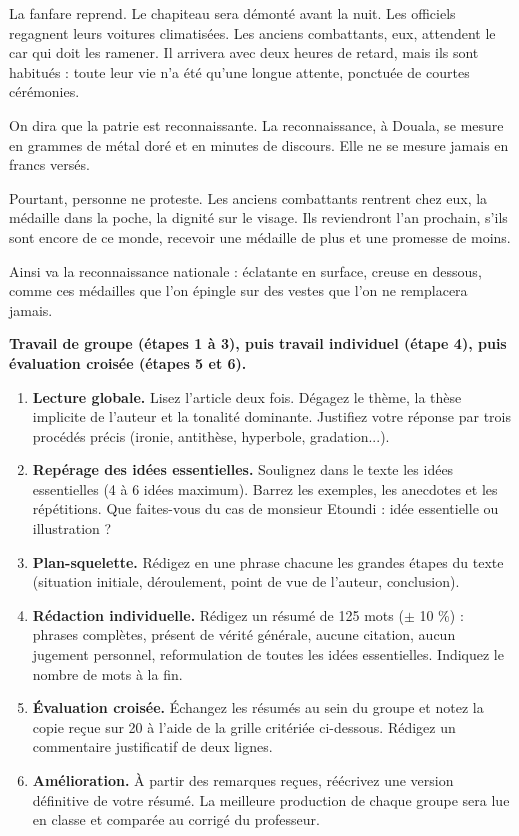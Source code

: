 \documentclass[11pt]{article}
\newcounter{popsec}
\newcounter{popsub}
\newcommand{\courssub}[1]{%
  \stepcounter{popsub}%
  \par\vspace{9pt}\noindent{\popxbold\fontsize{11.5}{13}\selectfont\color{popink}{\color{poporange}\thepopsec.\thepopsub}\hspace{6pt}#1}\par\nopagebreak\vspace{4pt}
}
\begin{document}
\begin{exemplebox}
La fanfare reprend. Le chapiteau sera démonté avant la nuit. Les officiels regagnent leurs voitures climatisées. Les anciens combattants, eux, attendent le car qui doit les ramener. Il arrivera avec deux heures de retard, mais ils sont habitués : toute leur vie n'a été qu'une longue attente, ponctuée de courtes cérémonies.

On dira que la patrie est reconnaissante. La reconnaissance, à Douala, se mesure en grammes de métal doré et en minutes de discours. Elle ne se mesure jamais en francs versés.

Pourtant, personne ne proteste. Les anciens combattants rentrent chez eux, la médaille dans la poche, la dignité sur le visage. Ils reviendront l'an prochain, s'ils sont encore de ce monde, recevoir une médaille de plus et une promesse de moins.

Ainsi va la reconnaissance nationale : éclatante en surface, creuse en dessous, comme ces médailles que l'on épingle sur des vestes que l'on ne remplacera jamais.
\end{exemplebox}

\courssub{Consignes}

\textbf{Travail de groupe (étapes 1 à 3), puis travail individuel (étape 4), puis évaluation croisée (étapes 5 et 6).}

\begin{enumerate}
\item \textbf{Lecture globale.} Lisez l'article deux fois. Dégagez le thème, la thèse implicite de l'auteur et la tonalité dominante. Justifiez votre réponse par trois procédés précis (ironie, antithèse, hyperbole, gradation...).
\item \textbf{Repérage des idées essentielles.} Soulignez dans le texte les idées essentielles (4 à 6 idées maximum). Barrez les exemples, les anecdotes et les répétitions. Que faites-vous du cas de monsieur Etoundi : idée essentielle ou illustration ?
\item \textbf{Plan-squelette.} Rédigez en une phrase chacune les grandes étapes du texte (situation initiale, déroulement, point de vue de l'auteur, conclusion).
\item \textbf{Rédaction individuelle.} Rédigez un résumé de 125 mots ($\pm$ 10 \%) : phrases complètes, présent de vérité générale, aucune citation, aucun jugement personnel, reformulation de toutes les idées essentielles. Indiquez le nombre de mots à la fin.
\item \textbf{Évaluation croisée.} Échangez les résumés au sein du groupe et notez la copie reçue sur 20 à l'aide de la grille critériée ci-dessous. Rédigez un commentaire justificatif de deux lignes.
\item \textbf{Amélioration.} À partir des remarques reçues, réécrivez une version définitive de votre résumé. La meilleure production de chaque groupe sera lue en classe et comparée au corrigé du professeur.
\end{enumerate}
\end{document}
